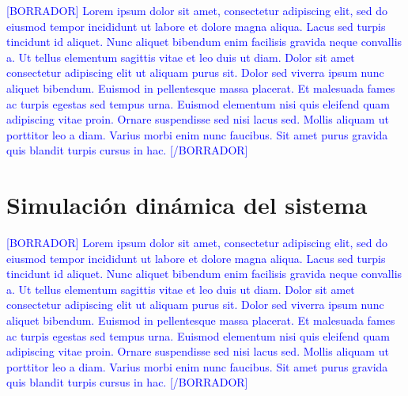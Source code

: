 \textcolor{blue}{[BORRADOR] Lorem ipsum dolor sit amet, consectetur adipiscing elit, sed do eiusmod tempor incididunt ut labore et dolore magna aliqua. Lacus sed turpis tincidunt id aliquet. Nunc aliquet bibendum enim facilisis gravida neque convallis a. Ut tellus elementum sagittis vitae et leo duis ut diam. Dolor sit amet consectetur adipiscing elit ut aliquam purus sit. Dolor sed viverra ipsum nunc aliquet bibendum. Euismod in pellentesque massa placerat. Et malesuada fames ac turpis egestas sed tempus urna. Euismod elementum nisi quis eleifend quam adipiscing vitae proin. Ornare suspendisse sed nisi lacus sed. Mollis aliquam ut porttitor leo a diam. Varius morbi enim nunc faucibus. Sit amet purus gravida quis blandit turpis cursus in hac. [/BORRADOR]} 


\section{Simulación dinámica del sistema}

\textcolor{blue}{[BORRADOR] Lorem ipsum dolor sit amet, consectetur adipiscing elit, sed do eiusmod tempor incididunt ut labore et dolore magna aliqua. Lacus sed turpis tincidunt id aliquet. Nunc aliquet bibendum enim facilisis gravida neque convallis a. Ut tellus elementum sagittis vitae et leo duis ut diam. Dolor sit amet consectetur adipiscing elit ut aliquam purus sit. Dolor sed viverra ipsum nunc aliquet bibendum. Euismod in pellentesque massa placerat. Et malesuada fames ac turpis egestas sed tempus urna. Euismod elementum nisi quis eleifend quam adipiscing vitae proin. Ornare suspendisse sed nisi lacus sed. Mollis aliquam ut porttitor leo a diam. Varius morbi enim nunc faucibus. Sit amet purus gravida quis blandit turpis cursus in hac. [/BORRADOR]} 


